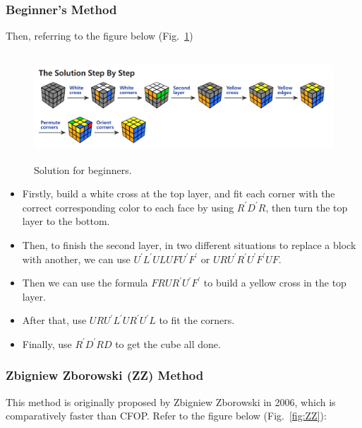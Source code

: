 \documentclass[12pt, a4paper]{article}
\begin{document}
\subsubsection*{Beginner's Method}
Then, referring to the figure below (Fig.~\ref{fig:solution1})

\begin{figure}[!htb]
    \centering
    \includegraphics[width=14cm, height=4cm]{solution1}
    \caption{Solution for beginners.\cite{BeginnerMethod}}
    \label{fig:solution1}
\end{figure}

\begin{itemize}
    \item Firstly, build a white cross at the top layer, and fit each corner with the correct corresponding color to each face by using $R^\prime D^\prime R$, 
          then turn the top layer to the bottom.
    \item Then, to finish the second layer, in two different situations to replace a block with another, 
          we can use $U^\prime L^\prime U L U F U^\prime F^\prime$ or $URU^\prime R^\prime U^\prime F^\prime UF$.
    \item Then we can use the formula $FRUR^\prime U^\prime F^\prime$ to build a yellow cross in the top layer.
    \item After that, use $URU^\prime L^\prime U R^\prime U^\prime L$ to fit the corners.
    \item Finally, use $R^\prime D^\prime RD$ to get the cube all done.
\end{itemize}

\subsubsection*{Zbigniew Zborowski (ZZ) Method}
This method is originally proposed by Zbigniew Zborowski in 2006, which is comparatively faster than CFOP. Refer to the figure below (Fig.~\ref{fig:ZZ}):
\end{document}
